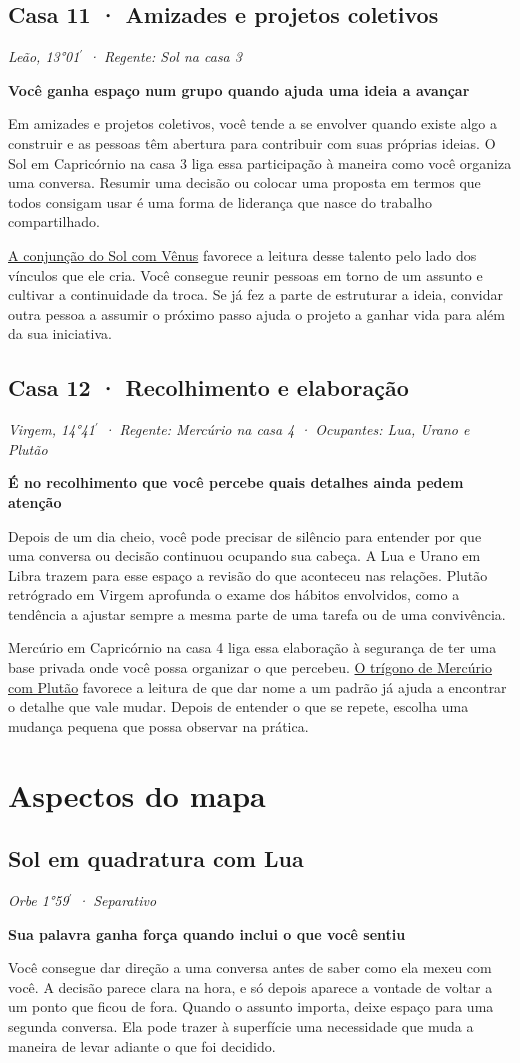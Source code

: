 \documentclass[11pt,a4paper]{article}
\newcommand{\leitura}[3]{\subsection{#1}\textit{#2}\par #3}
\newcommand{\subtituloleitura}[1]{\textbf{#1}\par\nopagebreak[4]}
\newcommand{\aspectoref}[2]{\hyperref[#1]{#2}}
\begin{document}
\leitura{Casa 11 · Amizades e projetos coletivos}{Leão, 13°01\ensuremath{^{\prime}} · Regente: Sol na casa 3}{
\subtituloleitura{Você ganha espaço num grupo quando ajuda uma ideia a avançar}
Em amizades e projetos coletivos, você tende a se envolver quando existe algo a construir e as pessoas têm abertura para contribuir com suas próprias ideias. O Sol em Capricórnio na casa 3 liga essa participação à maneira como você organiza uma conversa. Resumir uma decisão ou colocar uma proposta em termos que todos consigam usar é uma forma de liderança que nasce do trabalho compartilhado.

\aspectoref{aspecto:sol-venus}{A conjunção do Sol com Vênus} favorece a leitura desse talento pelo lado dos vínculos que ele cria. Você consegue reunir pessoas em torno de um assunto e cultivar a continuidade da troca. Se já fez a parte de estruturar a ideia, convidar outra pessoa a assumir o próximo passo ajuda o projeto a ganhar vida para além da sua iniciativa.
}

\leitura{Casa 12 · Recolhimento e elaboração}{Virgem, 14°41\ensuremath{^{\prime}} · Regente: Mercúrio na casa 4 · Ocupantes: Lua, Urano e Plutão}{
\subtituloleitura{É no recolhimento que você percebe quais detalhes ainda pedem atenção}
Depois de um dia cheio, você pode precisar de silêncio para entender por que uma conversa ou decisão continuou ocupando sua cabeça. A Lua e Urano em Libra trazem para esse espaço a revisão do que aconteceu nas relações. Plutão retrógrado em Virgem aprofunda o exame dos hábitos envolvidos, como a tendência a ajustar sempre a mesma parte de uma tarefa ou de uma convivência.

Mercúrio em Capricórnio na casa 4 liga essa elaboração à segurança de ter uma base privada onde você possa organizar o que percebeu. \aspectoref{aspecto:mercurio-plutao}{O trígono de Mercúrio com Plutão} favorece a leitura de que dar nome a um padrão já ajuda a encontrar o detalhe que vale mudar. Depois de entender o que se repete, escolha uma mudança pequena que possa observar na prática.
}

\clearpage

\section{Aspectos do mapa}

\leitura{Sol em quadratura com Lua}{Orbe 1°59\ensuremath{^{\prime}} · Separativo}{
\label{aspecto:sol-lua}\subtituloleitura{Sua palavra ganha força quando inclui o que você sentiu}
Você consegue dar direção a uma conversa antes de saber como ela mexeu com você. A decisão parece clara na hora, e só depois aparece a vontade de voltar a um ponto que ficou de fora. Quando o assunto importa, deixe espaço para uma segunda conversa. Ela pode trazer à superfície uma necessidade que muda a maneira de levar adiante o que foi decidido.
}
\end{document}
